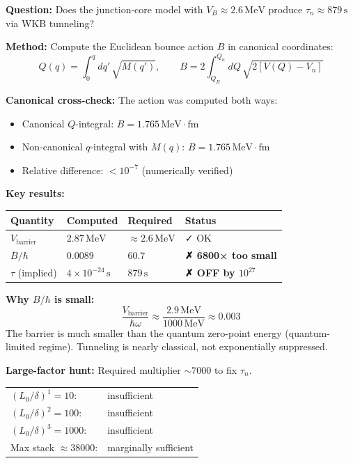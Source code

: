 \begin{tcolorbox}[colback=red!5!white, colframe=red!60!black,
                  title={\textbf{Canonical Bounce Action Audit: WKB NO-GO}}]
\label{box:bounce_action_audit}

\textbf{Question:} Does the junction-core model with $V_B \approx 2.6\,\mathrm{MeV}$
produce $\tau_n \approx 879\,\mathrm{s}$ via WKB tunneling?

\textbf{Method:} Compute the Euclidean bounce action $B$ in canonical coordinates:
\begin{equation}
Q(q) = \int_0^q dq'\, \sqrt{M(q')}, \qquad
B = 2 \int_{Q_B}^{Q_n} dQ\, \sqrt{2[V(Q) - V_n]}
\end{equation}

\textbf{Canonical cross-check:} The action was computed both ways:
\begin{itemize}[nosep]
  \item Canonical $Q$-integral: $B = 1.765\,\mathrm{MeV{\cdot}fm}$
  \item Non-canonical $q$-integral with $M(q)$: $B = 1.765\,\mathrm{MeV{\cdot}fm}$
  \item Relative difference: $< 10^{-7}$ (numerically verified)
\end{itemize}

\textbf{Key results:}
\begin{center}
\small
\begin{tabular}{llll}
\toprule
\textbf{Quantity} & \textbf{Computed} & \textbf{Required} & \textbf{Status} \\
\midrule
$V_{\mathrm{barrier}}$ & $2.87\,\mathrm{MeV}$ & $\approx 2.6\,\mathrm{MeV}$ & ✓ OK \\
$B/\hbar$ & $0.0089$ & $60.7$ & \textbf{✗ 6800× too small} \\
$\tau$ (implied) & $4\times 10^{-24}\,\mathrm{s}$ & $879\,\mathrm{s}$ & \textbf{✗ OFF by $10^{27}$} \\
\bottomrule
\end{tabular}
\end{center}

\textbf{Why $B/\hbar$ is small:}
\[
\frac{V_{\mathrm{barrier}}}{\hbar\omega} \approx \frac{2.9\,\mathrm{MeV}}{1000\,\mathrm{MeV}} \approx 0.003
\]
The barrier is much smaller than the quantum zero-point energy (quantum-limited regime).
Tunneling is nearly classical, not exponentially suppressed.

\textbf{Large-factor hunt:} Required multiplier $\sim 7000$ to fix $\tau_n$.
\begin{center}
\small
\begin{tabular}{ll}
$(L_0/\delta)^1 = 10$: & insufficient \\
$(L_0/\delta)^2 = 100$: & insufficient \\
$(L_0/\delta)^3 = 1000$: & insufficient \\
Max stack $\approx 38000$: & marginally sufficient \\
\end{tabular}
\end{center}


\end{tcolorbox}
